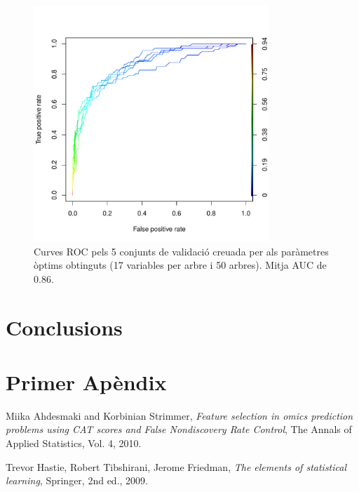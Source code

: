 \documentclass[a4paper,10pt]{article}
\begin{document}
\begin{figure}
\centering
\includegraphics[width=3.5in]{memoria-rf_roc}
\caption{Curves ROC pels 5 conjunts de validació creuada per als paràmetres òptims obtinguts (17 variables per arbre i 50 arbres). Mitja AUC de 0.86.} \label{fig:rf_roc}
\end{figure}


\section{Conclusions}


\appendix
\section{Primer Apèndix}

\begin{thebibliography}{9}


  Miika Ahdesmaki and Korbinian Strimmer,
  \emph{Feature selection in omics prediction problems using CAT scores and False Nondiscovery Rate Control},
  The Annals of Applied Statistics, 
  Vol. 4,
  2010.

  Trevor Hastie, Robert Tibshirani, Jerome Friedman,
  \emph{The elements of statistical learning},
  Springer,
  2nd ed., 
  2009.


\end{thebibliography}
\end{document}

